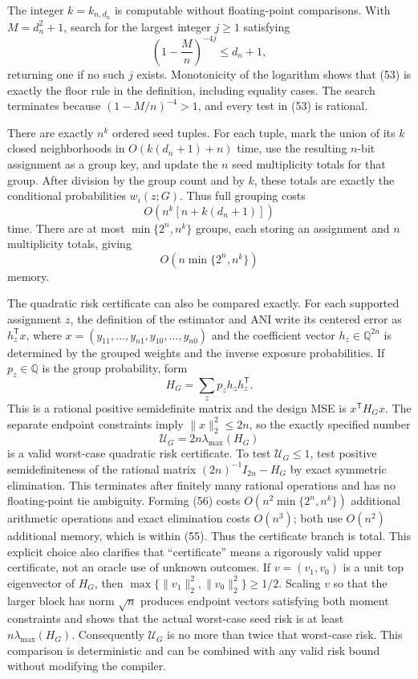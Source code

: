The integer \(k=k_{n,d_n}\) is computable without floating-point
comparisons.  With \(M=d_n^2+1\), search for the largest integer \(j\ge1\)
satisfying
\[
\left(1-\frac Mn\right)^{-4j}\le d_n+1,
\tag{53}
\]
returning one if no such \(j\) exists.  Monotonicity of the logarithm shows
that (53) is exactly the floor rule in the definition, including equality
cases.  The search terminates because \((1-M/n)^{-4}>1\), and every test
in (53) is rational.

There are exactly \(n^k\) ordered seed tuples.  For each tuple, mark the
union of its \(k\) closed neighborhoods in \(O(k(d_n+1)+n)\) time, use the
resulting \(n\)-bit assignment as a group key, and update the \(n\) seed
multiplicity totals for that group.  After division by the group count and
by \(k\), these totals are exactly the conditional probabilities
\(w_i(z;G)\).  Thus full grouping costs
\[
O\!\left(n^k[n+k(d_n+1)]\right)
\tag{54}
\]
time.  There are at most \(\min\{2^n,n^k\}\) groups, each storing an
assignment and \(n\) multiplicity totals, giving
\[
O\!\left(n\min\{2^n,n^k\}\right)
\tag{55}
\]
memory.

The quadratic risk certificate can also be compared exactly.  For each
supported assignment \(z\), the definition of the estimator and ANI write
its centered error as \(h_z^{\mathsf T}x\), where
\(x=(y_{11},\ldots,y_{n1},y_{10},\ldots,y_{n0})\) and the coefficient
vector \(h_z\in\mathbb Q^{2n}\) is determined by the grouped weights and
the inverse exposure probabilities.  If \(p_z\in\mathbb Q\) is the group
probability, form
\[
H_G=\sum_zp_zh_zh_z^{\mathsf T}.
\tag{56}
\]
This is a rational positive semidefinite matrix and the design MSE is
\(x^{\mathsf T}H_Gx\).  The separate endpoint constraints imply
\(\|x\|_2^2\le2n\), so the exactly specified number
\[
\mathcal U_G=2n\lambda_{\max}(H_G)
\tag{57}
\]
is a valid worst-case quadratic risk certificate.  To test
\(\mathcal U_G\le1\), test positive semidefiniteness of the rational matrix
\((2n)^{-1}I_{2n}-H_G\) by exact symmetric elimination.  This terminates
after finitely many rational operations and has no floating-point tie
ambiguity.  Forming (56) costs
\(O(n^2\min\{2^n,n^k\})\) additional arithmetic operations and exact
elimination costs \(O(n^3)\); both use \(O(n^2)\) additional memory, which
is within (55).  Thus the certificate branch is total.  This explicit
choice also clarifies that ``certificate'' means a rigorously valid upper
certificate, not an oracle use of unknown outcomes.
If \(v=(v_1,v_0)\) is a unit top eigenvector of \(H_G\), then
\(\max\{\|v_1\|_2^2,\|v_0\|_2^2\}\ge1/2\).  Scaling \(v\) so that the
larger block has norm \(\sqrt n\) produces endpoint vectors satisfying both
moment constraints and shows that the actual worst-case seed risk is at
least \(n\lambda_{\max}(H_G)\).  Consequently \(\mathcal U_G\) is no more
than twice that worst-case risk.  This comparison is deterministic and can
be combined with any valid risk bound without modifying the compiler.

